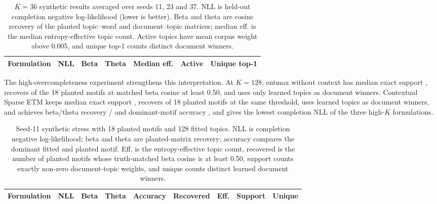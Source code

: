 \documentclass[10pt,a4paper]{article}
\begin{document}
\begin{table}[H]
\centering
\small
\caption{$K=36$ synthetic results averaged over seeds 11, 23 and 37. NLL is
held-out completion negative log-likelihood (lower is better). Beta and theta
are cosine recovery of the planted topic--word and document--topic matrices;
median eff. is the median entropy-effective topic count. Active topics have
mean corpus weight above 0.005, and unique top-1 counts distinct document
winners.}
\label{tab:synthetic}
\begin{tabular}{@{}lrrrrrr@{}}
\toprule
Formulation & NLL & Beta & Theta & Median eff. & Active & Unique top-1 \\
\midrule

\end{tabular}
\end{table}

The high-overcompleteness experiment strengthens this interpretation. At
$K=128$, entmax without context has median exact support
\HighKEntmaxMedianSupport{}, recovers \HighKEntmaxRecoveredMotifs{} of the 18
planted motifs at matched beta cosine at least 0.50, and uses only
\HighKEntmaxUniqueTopOne{} learned topics as document winners. Contextual Sparse
ETM keeps median exact support \HighKContextualMedianSupport{}, recovers
\HighKContextualRecoveredMotifs{} of 18 planted motifs at the same threshold,
uses \HighKContextualUniqueTopOne{} learned topics as document winners, and
achieves beta/theta recovery
\HighKContextualBetaRecovery{}/\HighKContextualThetaRecovery{} and dominant-motif
accuracy \HighKContextualDominantAccuracy{}, and gives the lowest completion NLL
of the three high-$K$ formulations.

\begin{table}[H]
\centering
\small
\caption{Seed-11 synthetic stress with 18 planted motifs and 128 fitted topics.
NLL is completion negative log-likelihood; beta and theta are planted-matrix
recovery; accuracy compares the dominant fitted and planted motif. Eff. is the
entropy-effective topic count, recovered is the number of planted motifs whose
truth-matched beta cosine is at least 0.50, support counts exactly non-zero
document-topic weights, and unique counts distinct learned document winners.}
\label{tab:high-k}
\begin{tabular}{@{}lrrrrrrrr@{}}
\toprule
Formulation & NLL & Beta & Theta & Accuracy & Recovered & Eff. & Support & Unique \\
\midrule

\end{tabular}
\end{table}
\end{document}
